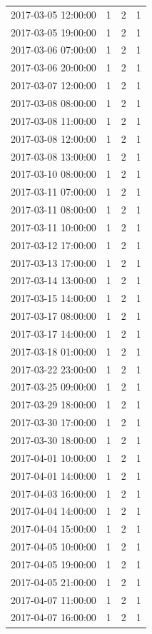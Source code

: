 \begin{tabular}{lrrr}
2017-03-05 12:00:00 & 1 & 2 & 1 \\
2017-03-05 19:00:00 & 1 & 2 & 1 \\
2017-03-06 07:00:00 & 1 & 2 & 1 \\
2017-03-06 20:00:00 & 1 & 2 & 1 \\
2017-03-07 12:00:00 & 1 & 2 & 1 \\
2017-03-08 08:00:00 & 1 & 2 & 1 \\
2017-03-08 11:00:00 & 1 & 2 & 1 \\
2017-03-08 12:00:00 & 1 & 2 & 1 \\
2017-03-08 13:00:00 & 1 & 2 & 1 \\
2017-03-10 08:00:00 & 1 & 2 & 1 \\
2017-03-11 07:00:00 & 1 & 2 & 1 \\
2017-03-11 08:00:00 & 1 & 2 & 1 \\
2017-03-11 10:00:00 & 1 & 2 & 1 \\
2017-03-12 17:00:00 & 1 & 2 & 1 \\
2017-03-13 17:00:00 & 1 & 2 & 1 \\
2017-03-14 13:00:00 & 1 & 2 & 1 \\
2017-03-15 14:00:00 & 1 & 2 & 1 \\
2017-03-17 08:00:00 & 1 & 2 & 1 \\
2017-03-17 14:00:00 & 1 & 2 & 1 \\
2017-03-18 01:00:00 & 1 & 2 & 1 \\
2017-03-22 23:00:00 & 1 & 2 & 1 \\
2017-03-25 09:00:00 & 1 & 2 & 1 \\
2017-03-29 18:00:00 & 1 & 2 & 1 \\
2017-03-30 17:00:00 & 1 & 2 & 1 \\
2017-03-30 18:00:00 & 1 & 2 & 1 \\
2017-04-01 10:00:00 & 1 & 2 & 1 \\
2017-04-01 14:00:00 & 1 & 2 & 1 \\
2017-04-03 16:00:00 & 1 & 2 & 1 \\
2017-04-04 14:00:00 & 1 & 2 & 1 \\
2017-04-04 15:00:00 & 1 & 2 & 1 \\
2017-04-05 10:00:00 & 1 & 2 & 1 \\
2017-04-05 19:00:00 & 1 & 2 & 1 \\
2017-04-05 21:00:00 & 1 & 2 & 1 \\
2017-04-07 11:00:00 & 1 & 2 & 1 \\
2017-04-07 16:00:00 & 1 & 2 & 1 \\

\end{tabular}
